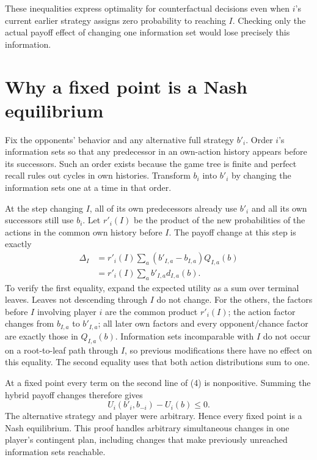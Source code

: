 \documentclass[11pt]{article}
\begin{document}
These inequalities express optimality for counterfactual decisions even
when $i$'s current earlier strategy assigns zero probability to reaching
$I$. Checking only the actual payoff effect of changing one information
set would lose precisely this information.

\section*{Why a fixed point is a Nash equilibrium}
Fix the opponents' behavior and any alternative full strategy $b'_i$.
Order $i$'s information sets so that any predecessor in an own-action
history appears before its successors. Such an order exists because the
game tree is finite and perfect recall rules out cycles in own histories.
Transform $b_i$ into $b'_i$ by changing the information sets one at a time
in that order.

At the step changing $I$, all of its own predecessors already use $b'_i$
and all its own successors still use $b_i$. Let
$r'_i(I)$ be the product of the new probabilities of the actions in the
common own history before $I$. The payoff change at this step is exactly
\[
 \begin{aligned}
 \Delta_I
 &=r'_i(I)\sum_a (b'_{I,a}-b_{I,a})Q_{I,a}(b)\\
 &=r'_i(I)\sum_a b'_{I,a}d_{I,a}(b).
 \end{aligned}
 \tag{4}
\]
To verify the first equality, expand the expected utility as a sum over
terminal leaves. Leaves not descending through $I$ do not change.
For the others, the factors before $I$ involving player $i$ are the
common product $r'_i(I)$; the action factor changes from $b_{I,a}$ to
$b'_{I,a}$; all later own factors and every opponent/chance factor are
exactly those in $Q_{I,a}(b)$. Information sets incomparable with $I$
do not occur on a root-to-leaf path through $I$, so previous modifications
there have no effect on this equality. The second equality uses that
both action distributions sum to one.

At a fixed point every term on the second line of (4) is nonpositive.
Summing the hybrid payoff changes therefore gives
\[
                         U_i(b'_i,b_{-i})-U_i(b)\leq0.
\]
The alternative strategy and player were arbitrary. Hence every fixed
point is a Nash equilibrium. This proof handles arbitrary simultaneous
changes in one player's contingent plan, including changes that make
previously unreached information sets reachable.
\end{document}
